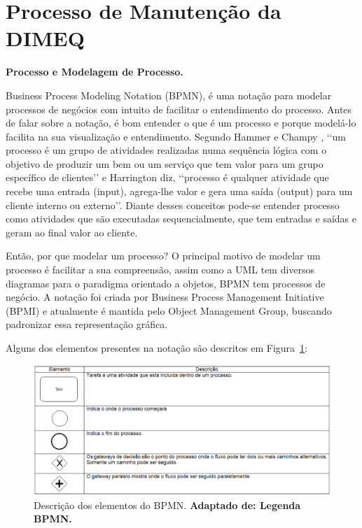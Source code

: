 
\section{Processo de Manutenção da DIMEQ}
\label{bpmn}

\textbf{Processo e Modelagem de Processo.}

Business Process Modeling Notation (BPMN), é uma notação para modelar processos de negócios com intuito de facilitar o entendimento do processo. Antes de falar sobre a notação, é bom entender o que é um processo e porque modelá-lo facilita na sua visualização e entendimento. Segundo Hammer e Champy \cite{hammer1994reengenharia}, {\lq\lq um processo é um grupo de atividades realizadas numa sequência lógica com o objetivo de produzir um bem ou um serviço que tem valor para um grupo específico de clientes\rq\rq} e Harrington \cite{harrington1993aperfeiccoando} diz, \lq\lq processo é qualquer atividade que recebe uma entrada (input), agrega-lhe valor e gera uma saída (output) para um cliente interno ou externo\rq\rq. Diante desses conceitos pode-se entender processo como atividades que são executadas sequencialmente, que tem entradas e saídas e geram ao final valor ao cliente.

Então, por que modelar um processo? O principal motivo de modelar um processo é facilitar a sua compreensão, assim como a UML tem diversos diagramas para o paradigma orientado a objetos, BPMN tem processos de negócio. A notação foi criada por Business Process Management Initiative (BPMI) e atualmente é mantida pelo Object Management Group, buscando padronizar essa representação gráfica.

Alguns dos elementos presentes na notação são descritos em Figura~\ref{table-processo}:


\graphicspath{{figuras/}}
\begin{figure}[H]
\centering
\includegraphics[width=1.0 \textwidth]{tabela-processo}
\caption{Descrição dos elementos do BPMN. \textbf{Adaptado de: Legenda BPMN.}}
\label{table-processo}
\end{figure}

